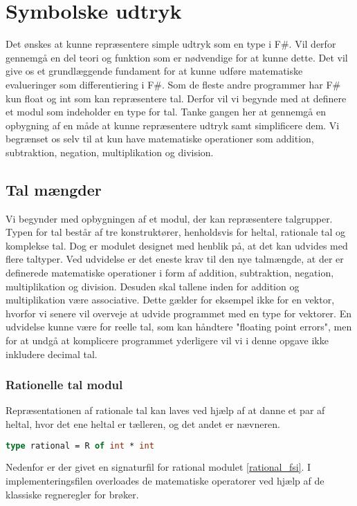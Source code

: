 
\section{Symbolske udtryk}
Det ønskes at kunne repræsentere simple udtryk som en type i F\#. Vil derfor gennemgå en del teori og funktion som er nødvendige for at kunne dette. Det vil give os et grundlæggende fundament for at kunne udføre matematiske evalueringer som differentiering i F\#. Som de fleste andre programmer har F\# kun float og int som kan repræsentere tal. Derfor vil vi begynde med at definere et modul som indeholder en type for tal. Tanke gangen her at gennemgå en opbygning af en måde at kunne repræsentere udtryk samt simplificere dem. Vi begrænset os selv til at kun have matematiske operationer som addition, subtraktion, negation, multiplikation og division.

\subsection{Tal mængder}
Vi begynder med opbygningen af et modul, der kan repræsentere talgrupper. Typen for tal består af tre konstruktører, henholdsvis for heltal, rationale tal og komplekse tal. Dog er modulet designet med henblik på, at det kan udvides med flere taltyper. Ved udvidelse er det eneste krav til den nye talmængde, at der er definerede matematiske operationer i form af addition, subtraktion, negation, multiplikation og division. Desuden skal tallene inden for addition og multiplikation være associative. Dette gælder for eksempel ikke for en vektor, hvorfor vi senere vil overveje at udvide programmet med en type for vektorer. En udvidelse kunne være for reelle tal, som kan håndtere "floating point errors", men for at undgå at komplicere programmet yderligere vil vi i denne opgave ikke inkludere decimal tal.

\subsubsection{Rationelle tal modul}
Repræsentationen af rationale tal kan laves ved hjælp af at danne et par af heltal, hvor det ene heltal er tælleren, og det andet er nævneren.


\begin{lstlisting}[language={FSharp}, 
    label={type_rationel},
    caption={Typen for rationelle tal}]
type rational = R of int * int
\end{lstlisting}
Nedenfor er der givet en signaturfil for rational modulet \ref{rational_fsi}. I implementeringsfilen overloades de matematiske operatorer ved hjælp af de klassiske regneregler for brøker.

